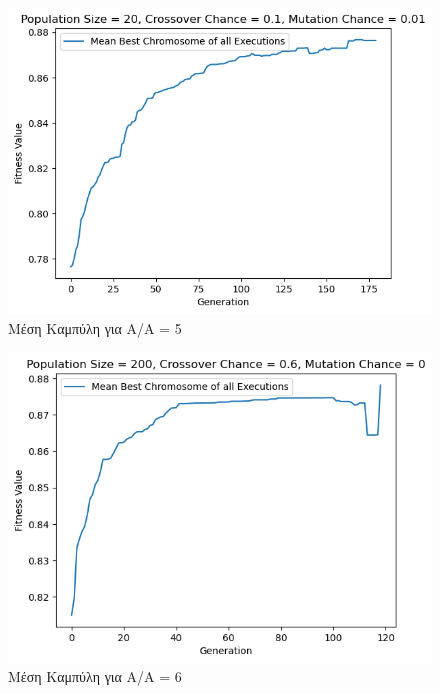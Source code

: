 \documentclass[12pt,a4paper]{article}
\begin{document}
\begin{figure}[H]
	\includegraphics[width=\textwidth]{Figures/9. Means for AA = 5.png}
	\caption{Μέση Καμπύλη για A/A = 5}
\end{figure}

\begin{figure}[H]
	\includegraphics[width=\textwidth]{Figures/11. Means for AA = 6.png}
	\caption{Μέση Καμπύλη για A/A = 6}
\end{figure}
\end{document}
